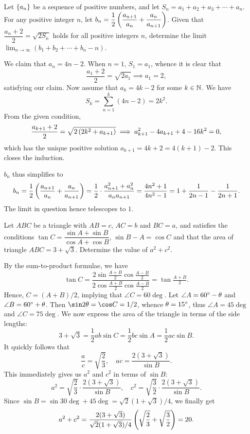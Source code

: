 \begin{question}[1]\label{Q::2023-O-1-18}
    Let $\left\lbrace a_n \right\rbrace$ be a sequence of positive numbers, and let $S_n = a_1 + a_2 + a_3 + \cdots + a_n$. For any positive integer $n$, let $b_n = \dfrac12 \left( \dfrac{a_{n+1}}{a_n} + \dfrac{a_n}{a_{n+1}} \right)$. Given that $\dfrac{a_n + 2}{2} = \sqrt{2S_n}$ holds for all positive integers $n$, determine the limit $\lim_{n \to \infty} (b_1 + b_2 + \cdots + b_n - n)$.
\end{question}
\begin{solution*}
    We claim that $a_n = 4n - 2$. When $n = 1$, $S_1 = a_1$, whence it is clear that \[\frac{a_1 + 2}{2} = \sqrt{2a_1} \implies a_1 = 2,\] satisfying our claim. Now assume that $a_k = 4k - 2$ for some $k \in \mathbb{N}$. We have \[S_k = \sum_{n = 1}^k (4n - 2) = 2k^2.\] From the given condition, \[\frac{a_{k+1} + 2}{2} = \sqrt{2 \left( 2k^2 + a_{k+1} \right)} \implies a^2_{k+1} - 4a_{k+1} + 4 - 16k^2 = 0,\] which has the unique positive solution $a_{k+1} = 4k + 2 = 4(k+1) - 2$. This closes the induction.

    $b_n$ thus simplifies to \[b_n = \frac12 \left( \dfrac{a_{n+1}}{a_n} + \dfrac{a_n}{a_{n+1}} \right) = \frac12 \cdot \frac{a^2_{n+1} + a^2_n}{a_n a_{n+1}} = \frac{4n^2 + 1}{4n^2 - 1} = 1 + \frac1{2n-1} - \frac{1}{2n+1}.\] The limit in question hence telescopes to $1$.
\end{solution*}
    
\begin{question}[20]\label{Q::2023-O-1-19}
    Let $ABC$ be a triangle with $AB = c$, $AC = b$ and $BC = a$, and satisfies the conditions $\tan C = \dfrac{\sin A + \sin B}{\cos A + \cos B}$, $\sin{B - A} = \cos C$ and that the area of triangle $ABC = 3 + \sqrt{3}$. Determine the value of $a^2 + c^2$.
\end{question}
\begin{solution*}
    By the sum-to-product formulae, we have \[\tan C = \frac{2\sin{\frac{A+B}{2}} \cos{\frac{A-B}{2}}}{2\cos{\frac{A+B}{2}} \cos{\frac{A-B}{2}}} = \tan{\tfrac{A+B}{2}}.\] Hence, $C = (A+B)/2$, implying that $\angle C = 60\deg$. Let $\angle A = 60^{\circ} - \theta$ and $\angle B = 60^{\circ} + \theta$. Then $\sin 2\t = \cos C = 1/2$, whence $\theta = 15^{\circ}$, thus $\angle A = 45\deg$ and $\angle C = 75\deg$. We now express the area of the triangle in terms of the side lengths: \[3 + \sqrt{3} = \frac12 ab \sin C = \frac12 bc \sin A = \frac12 ac \sin B.\] It quickly follows that \[\frac{a}{c} = \sqrt{\frac23}, \quad ac = \frac{2(3 + \sqrt3)}{\sin B}.\] This immediately gives us $a^2$ and $c^2$ in terms of $\sin B$: \[a^2 = \sqrt{\frac23} \cdot \frac{2(3 + \sqrt3)}{\sin B}, \quad c^2 = \sqrt{\frac32} \cdot \frac{2(3 + \sqrt3)}{\sin B}.\] Since $\sin B = \sin{30\deg + 45\deg} = \sqrt{2}(1 + \sqrt3)/4$, we finally get \[a^2 + c^2 = \frac{2(3 + \sqrt3)}{\sqrt{2}(1 + \sqrt3)/4} \left( \sqrt{\frac23} + \sqrt{\frac32} \right) = 20.\]
\end{solution*}
    
